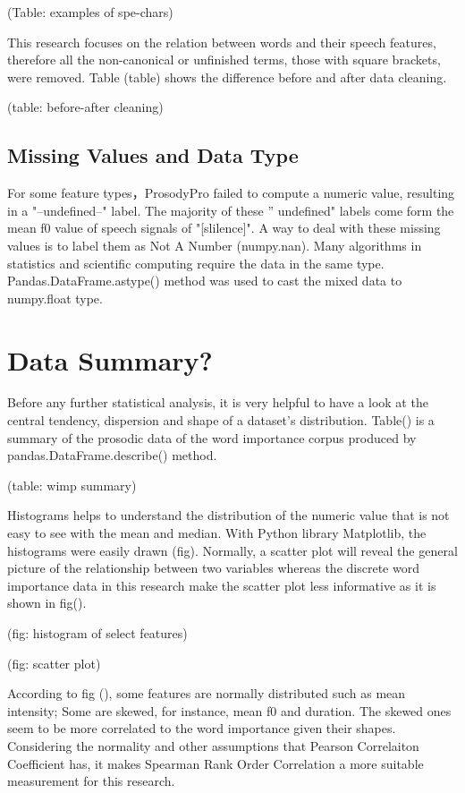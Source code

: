 (Table: examples of spe-chars)

This research focuses on the relation between words and their speech features, therefore all the non-canonical  or unfinished terms, those with square brackets, were removed. Table (table) shows the difference before and after data cleaning.

(table: before-after cleaning)

\subsection{Missing Values and Data Type}
For some feature types，ProsodyPro failed to compute a numeric value, resulting in a "--undefined--" label. The majority of these '' undefined" labels come form the mean f0 value of speech signals of "[slilence]". A way to deal with these missing values is to label them as Not A Number (numpy.nan). Many algorithms in statistics and scientific computing require the data in the same type. Pandas.DataFrame.astype() method was used to cast the mixed data to numpy.float type.


\section{Data Summary?}
Before any further statistical analysis, it is very helpful to have a look at the central tendency, dispersion and shape of a dataset's distribution. Table() is a summary of the prosodic data of the word importance corpus produced by pandas.DataFrame.describe() method.

(table: wimp summary)

Histograms helps to understand the distribution of the numeric value that is not easy to see with the mean and median. With Python library Matplotlib, the histograms were easily drawn (fig). Normally, a scatter plot will reveal the general picture of the relationship between two variables whereas the discrete word importance data in this research make the scatter plot less informative as it is shown in fig().

(fig: histogram of select features)

(fig: scatter plot)

According to fig (), some features are normally distributed such as  mean intensity; Some are skewed, for instance, mean f0 and duration. The skewed ones seem to be more correlated to the word importance given their shapes. Considering the normality and other assumptions that Pearson Correlaiton Coefficient has, it makes Spearman Rank Order Correlation a more suitable measurement for this research.

